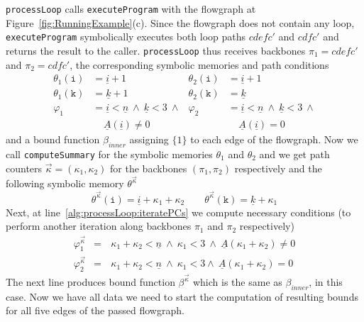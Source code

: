 \documentclass[10pt,a4paper]{article}
\newcommand{\var}[1]{\texttt{#1}}
\newcommand{\sym}[1]{\ensuremath{\underline{#1}}}
\begin{document}
\texttt{processLoop} calls \texttt{executeProgram} with the
flowgraph at Figure~\ref{fig:RunningExample}(c). Since the flowgraph does not
contain any loop, \texttt{executeProgram} symbolically executes both loop
paths $ \mathit{cdefc'}$ and $ \mathit{cdfc'}$ and returns the result to the
caller. \texttt{processLoop} thus receives backbones $\pi_1 = \mathit{cdefc'}$
and $ \pi_2=\mathit{cdfc'}$, the corresponding symbolic memories and path
conditions
\begin{align*}
\theta_1(\var{i}) &= \sym{i}+1 & \theta_2(\var{i}) &= \sym{i}+1\\
\theta_1(\var{k}) &= \sym{k}+1 & \theta_2(\var{k}) &= \sym{k}\\
\varphi_1 &= \sym{i}<\sym{n} ~\wedge~ \sym{k}<3~\wedge &
\varphi_2 &= \sym{i}<\sym{n} ~\wedge~ \sym{k}<3~\wedge \\
&~~~~~\sym{A}(\sym{i})\neq 0 &
&~~~~~\sym{A}(\sym{i})=0
\end{align*}
and a bound function $\beta_\mathit{inner}$ assigning $\{1\}$ to each edge of
the flowgraph. Now we call \texttt{computeSummary} for the symbolic memories $
\theta_1 $ and $ \theta_2 $ and we get path counters
$\vec{\kappa}=(\kappa_1,\kappa_2)$ for the backbones $ (\pi_1, \pi_2) $
respectively and the following symbolic memory $\theta^{\vec{\kappa}}$
$$
\theta^{\vec{\kappa}}(\var{i})=\sym{i}+\kappa_1+\kappa_2 
\qquad
\theta^{\vec{\kappa}}(\var{k})=\sym{k}+\kappa_1
$$
Next, at line~\ref{alg:processLoop:iteratePCs} we compute necessary conditions
(to perform another iteration along backbones $\pi_1$ and $\pi_2$ respectively)
\[
\begin{array}{rcl}
\varphi^{\vec{\kappa}}_1 & =\, & \kappa_1+\kappa_2<\sym{n}~ 
\wedge~\kappa_1<3~\wedge~\sym{A}(\kappa_1+\kappa_2)\neq0
\\
\varphi^{\vec{\kappa}}_2 & =\, & \kappa_1+\kappa_2<\sym{n}~
\wedge~\kappa_1<3\wedge~\sym{A}(\kappa_1+\kappa_2)=0
\end{array}
\]
The next line produces bound function $\beta^{\vec{\kappa}}$ which is the same
as $\beta_\mathit{inner}$, in this case. Now we have all data we need to start
the computation of resulting bounds for all five edges of the passed flowgraph.
\end{document}
